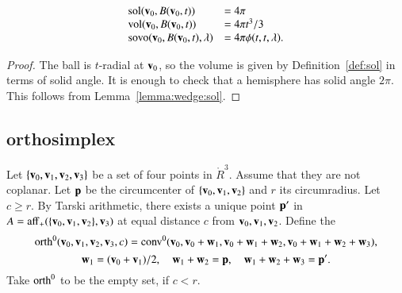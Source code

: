\begin{lemma}  
\begin{displaymath}
\begin{array}{lll}
{\operatorname{sol}}({\mathbf v}_0,B({\mathbf v}_0,t)) &= 4\pi\\
{\operatorname{vol}}({\mathbf v}_0,B({\mathbf v}_0,t)) &= 4\pi t^3/3\\
{\operatorname{sovo}}({\mathbf v}_0,B({\mathbf v}_0,t),\lambda) &= 4 \pi \phi(t,t,\lambda).
\end{array}
\end{displaymath}
\end{lemma}

\begin{proof}
The ball is $t$-radial at ${\mathbf v}_0$, so the volume is given by
Definition~\ref{def:sol} in terms of solid angle.  It is enough
to check that a hemisphere has solid angle $2\pi$.  This follows
from Lemma~\ref{lemma:wedge:sol}.
\end{proof}  




\subsection{orthosimplex}
%



\begin{definition}[orth]  Let
$\{{\mathbf v}_0,{\mathbf v}_1,{\mathbf v}_2,{\mathbf v}_3\}$ be a set of four points in $\ring{R}^3$.
Assume that they are not coplanar.  Let ${\mathbf p}$ be the circumcenter of
$\{{\mathbf v}_0,{\mathbf v}_1,{\mathbf v}_2\}$ and $r$ its circumradius.  Let $c\ge r$.  By
Tarski arithmetic, %
there exists a unique point ${\mathbf p}'$ in
$A={\operatorname{aff}}_+(\{{\mathbf v}_0,{\mathbf v}_1,{\mathbf v}_2\},{\mathbf v}_3)$ at equal distance $c$ from
${\mathbf v}_0,{\mathbf v}_1,{\mathbf v}_2$.  Define the 
%
%
\begin{displaymath}
{\operatorname{orth}}^0({\mathbf v}_0,{\mathbf v}_1,{\mathbf v}_2,{\mathbf v}_3,c) = 
{\operatorname{conv}}^0({\mathbf v}_0,{\mathbf v}_0+{\mathbf w}_1,{\mathbf v}_0+{\mathbf w}_1+{\mathbf w}_2,{\mathbf v}_0+{\mathbf w}_1+{\mathbf w}_2+{\mathbf w}_3),
\end{displaymath}
\begin{equation}\label{eqn:ortho}
{\mathbf w}_1=({\mathbf v}_0+{\mathbf v}_1)/2,\quad {\mathbf w}_1+{\mathbf w}_2={\mathbf p},\quad {\mathbf w}_1+{\mathbf w}_2+{\mathbf w}_3={\mathbf p}'.
\end{equation}
Take ${\operatorname{orth}}^0$ to be the empty set, if $c< r$.
%
%
\end{definition}


